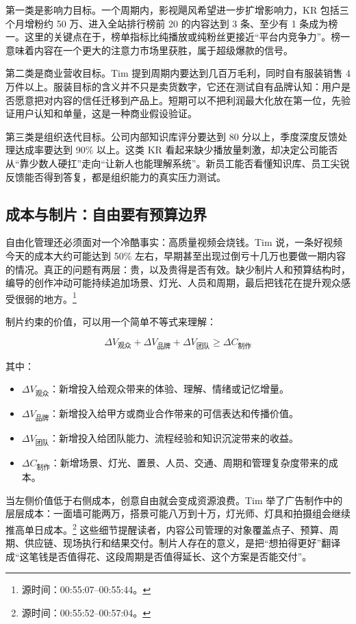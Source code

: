 \documentclass[a4paper]{article}
\begin{document}
第一类是影响力目标。一个周期内，影视飓风希望进一步扩增影响力，KR 包括三个月增粉约 50 万、进入全站排行榜前 20 的内容达到 3 条、至少有 1 条成为榜一。这里的关键点在于，榜单指标比纯播放或纯粉丝更接近“平台内竞争力”。榜一意味着内容在一个更大的注意力市场里获胜，属于超级爆款的信号。

第二类是商业营收目标。Tim 提到周期内要达到几百万毛利，同时自有服装销售 4 万件以上。服装目标的含义并不只是卖货数字，它还在测试自有品牌认知：用户是否愿意把对内容的信任迁移到产品上。短期可以不把利润最大化放在第一位，先验证用户认知和单量，这是一种商业假设验证。

第三类是组织迭代目标。公司内部知识库评分要达到 80 分以上，季度深度反馈处理达成率要达到 90\% 以上。这类 KR 看起来缺少播放量刺激，却决定公司能否从“靠少数人硬扛”走向“让新人也能理解系统”。新员工能否看懂知识库、员工尖锐反馈能否得到答复，都是组织能力的真实压力测试。

\subsection{成本与制片：自由要有预算边界}

自由化管理还必须面对一个冷酷事实：高质量视频会烧钱。Tim 说，一条好视频今天的成本大约可能达到 50\% 左右，早期甚至出现过倒亏十几万也要做一期内容的情况。真正的问题有两层：贵，以及贵得是否有效。缺少制片人和预算结构时，编导的创作冲动可能持续追加场景、灯光、人员和周期，最后把钱花在提升观众感受很弱的地方。\footnote{源时间：00:55:07--00:55:44。}

制片约束的价值，可以用一个简单不等式来理解：

$$
\Delta V_{\text{观众}} + \Delta V_{\text{品牌}} + \Delta V_{\text{团队}} \geq \Delta C_{\text{制作}}
$$

其中：
\begin{itemize}
  \item $\Delta V_{\text{观众}}$：新增投入给观众带来的体验、理解、情绪或记忆增量。
  \item $\Delta V_{\text{品牌}}$：新增投入给甲方或商业合作带来的可信表达和传播价值。
  \item $\Delta V_{\text{团队}}$：新增投入给团队能力、流程经验和知识沉淀带来的收益。
  \item $\Delta C_{\text{制作}}$：新增场景、灯光、置景、人员、交通、周期和管理复杂度带来的成本。
\end{itemize}

当左侧价值低于右侧成本，创意自由就会变成资源浪费。Tim 举了广告制作中的层层成本：一面墙可能两万，搭景可能八万到十万，灯光师、灯具和拍摄组会继续推高单日成本。\footnote{源时间：00:55:52--00:57:04。} 这些细节提醒读者，内容公司管理的对象覆盖点子、预算、周期、供应链、现场执行和结果交付。制片人存在的意义，是把“想拍得更好”翻译成“这笔钱是否值得花、这段周期是否值得延长、这个方案是否能交付”。
\end{document}
